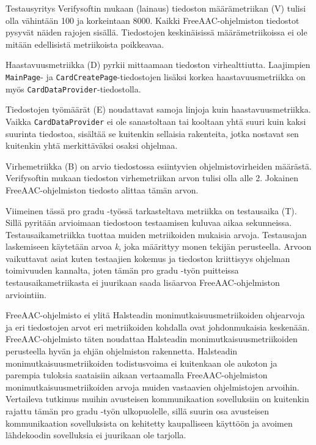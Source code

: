 \documentclass[utf8]{gradu3}
\begin{document}
Testausyritys Verifysoftin mukaan (lainaus) tiedoston määrämetriikan (V) tulisi olla vähintään 100 ja korkeintaan 8000. Kaikki FreeAAC-ohjelmiston tiedostot pysyvät näiden rajojen sisällä. Tiedostojen keskinäisissä määrämetriikoissa ei ole mitään edellisistä metriikoista poikkeavaa.

Haastavuusmetriikka (D) pyrkii mittaamaan tiedoston virhealttiutta. Laajimpien \texttt{MainPage}- ja \texttt{CardCreatePage}-tiedostojen lisäksi korkea haastavuusmetriikka on myös \texttt{CardDataProvider}-tiedostolla.

Tiedostojen työmäärät (E) noudattavat samoja linjoja kuin haastavuusmetriikka. Vaikka \texttt{CardDataProvider} ei ole sanastoltaan tai kooltaan yhtä suuri kuin kaksi suurinta tiedostoa, sisältää se kuitenkin sellaisia rakenteita, jotka nostavat sen kuitenkin yhtä merkittäväksi osaksi ohjelmaa.

Virhemetriikka (B) on arvio tiedostossa esiintyvien ohjelmistovirheiden määrästä. Verifysoftin mukaan tiedoston virhemetriikan arvon tulisi olla alle 2. Jokainen FreeAAC-ohjelmiston tiedosto alittaa tämän arvon.

Viimeinen tässä pro gradu -työssä tarkasteltava metriikka on testausaika (T). Sillä pyritään arvioimaan tiedostoon testaamisen kuluvaa aikaa sekunneissa. Testausaikametriikka tuottaa muiden metriikoiden mukaisia arvoja. Testausajan laskemiseen käytetään arvoa \textit{k}, joka määrittyy monen tekijän perusteella. Arvoon vaikuttavat asiat kuten testaajien kokemus ja tiedoston kriittisyys ohjelman toimivuuden kannalta, joten tämän pro gradu -työn puitteissa testausaikametriikasta ei juurikaan saada lisäarvoa FreeAAC-ohjelmiston arviointiin.

FreeAAC-ohjelmisto ei ylitä Halsteadin monimutkaisuusmetriikoiden ohjearvoja ja eri tiedostojen arvot eri metriikoiden kohdalla ovat johdonmukaisia keskenään. FreeAAC-ohjelmisto täten noudattaa Halsteadin monimutkaisuusmetriikoiden perusteella hyvän ja ehjän ohjelmiston rakennetta. Halsteadin monimutkaisuusmetriikoiden todistusvoima ei kuitenkaan ole aukoton ja parempia tuloksia saataisiin aikaan vertaamalla FreeAAC-ohjelmiston monimutkaisuusmetriikoiden arvoja muiden vastaavien ohjelmistojen arvoihin. Vertaileva tutkimus muihin avusteisen kommunikaation sovelluksiin on kuitenkin rajattu tämän pro gradu -työn ulkopuolelle, sillä suurin osa avusteisen kommunikaation sovelluksista on kehitetty kaupalliseen käyttöön ja avoimen lähdekoodin sovelluksia ei juurikaan ole tarjolla.
\end{document}
